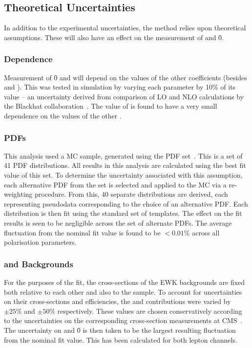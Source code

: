 \subsection{Theoretical Uncertainties}
In addition to the experimental uncertainties, the method relies upon
theoretical assumptions. These will also have an effect on the measurement of
\fLmfR and \f0.

\subsubsection{\Ai Dependence}
Measurement of \f0 and \fLmfR will depend on the values of the other \Ai
coefficients (besides \Azero and \Afour). This was tested in simulation by
varying each parameter \Ai by 10\% of its value -- an uncertainty derived from
comparison of \ac{LO} and \ac{NLO} calculations by the Blackhat
collaboration~\cite{berger_nlo_qcd_wjet}. The value of \fLmfR is found to have a
very small dependence on the values of the other \Ai.

\subsubsection{\aclp{PDF}}
\label{sec:wpol_syst_pdf}
This analysis used a \Wjets \ac{MC} sample, generated using the \cteqsixlone
\ac{PDF} set~\cite{cteq6l1}. This is a set of 41 \ac{PDF} distributions. All
results in this analysis are calculated using the best fit value of this set. To
determine the uncertainty associated with this assumption, each alternative
\ac{PDF} from the set is selected and applied to the \ac{MC} via a re-weighting
procedure. From this, 40 separate \LP distributions are derived, each
representing pseudodata corresponding to the choice of an alternative
\ac{PDF}. Each distribution is then fit using the standard set of templates. The
effect on the fit results is seen to be negligible across the set of alternate
\acp{PDF}. The average fluctuation from the nominal fit value is found to be $<
0.01\%$ across all polarisation parameters.

\subsubsection{\Zjets and \ttbar Backgrounds}
For the purposes of the fit, the cross-sections of the \ac{EWK} backgrounds are
fixed both relative to each other and also to the \Wjets sample. To account for
uncertainties on their cross-sections and efficiencies, the \Zjets and \ttbar
contributions were varied by $\pm 25\%$ and $\pm 50\%$ respectively. These
values are chosen conservatively according to the uncertainties on the
corresponding cross-section measurements at
\ac{CMS}~\cite{cms_wz_pas,cms_ttbar_paper}. The uncertainty on \fLmfR and \f0 is
then taken to be the largest resulting fluctuation from the nominal fit
value. This has been calculated for both lepton channels.

